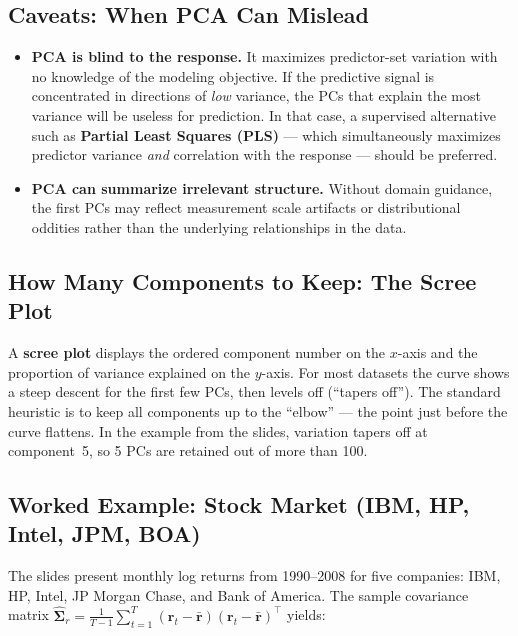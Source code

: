 \documentclass[11pt]{article}
\begin{document}
\subsection{Caveats: When PCA Can Mislead}
\begin{itemize}
    \item \textbf{PCA is blind to the response.} It maximizes predictor-set variation with no knowledge of the modeling objective. If the predictive signal is concentrated in directions of \emph{low} variance, the PCs that explain the most variance will be useless for prediction. In that case, a supervised alternative such as \textbf{Partial Least Squares (PLS)} --- which simultaneously maximizes predictor variance \emph{and} correlation with the response --- should be preferred.
    \item \textbf{PCA can summarize irrelevant structure.} Without domain guidance, the first PCs may reflect measurement scale artifacts or distributional oddities rather than the underlying relationships in the data.
\end{itemize}

\subsection{How Many Components to Keep: The Scree Plot}
A \textbf{scree plot} displays the ordered component number on the $x$-axis and the proportion of variance explained on the $y$-axis. For most datasets the curve shows a steep descent for the first few PCs, then levels off (``tapers off''). The standard heuristic is to keep all components up to the ``elbow'' --- the point just before the curve flattens. In the example from the slides, variation tapers off at component~5, so 5 PCs are retained out of more than 100.

\subsection{Worked Example: Stock Market (IBM, HP, Intel, JPM, BOA)}
The slides present monthly log returns from 1990--2008 for five companies: IBM, HP, Intel, JP Morgan Chase, and Bank of America. The sample covariance matrix $\hat{\boldsymbol{\Sigma}}_r = \frac{1}{T-1}\sum_{t=1}^{T}(\mathbf{r}_t - \bar{\mathbf{r}})(\mathbf{r}_t - \bar{\mathbf{r}})^{\top}$ yields:
\end{document}
